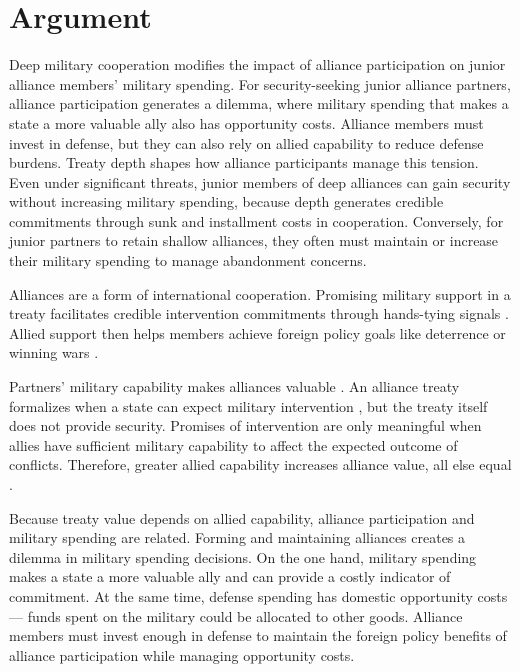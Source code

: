 \documentclass[12pt]{article}
\begin{document}
\section{Argument}

Deep military cooperation modifies the impact of alliance participation on junior alliance members' military spending.
For security-seeking junior alliance partners, alliance participation generates a dilemma, where military spending that makes a state a more valuable ally also has opportunity costs. 
Alliance members must invest in defense, but they can also rely on allied capability to reduce defense burdens. 
Treaty depth shapes how alliance participants manage this tension. 
Even under significant threats, junior members of deep alliances can gain security without increasing military spending, because depth generates credible commitments through sunk and installment costs in cooperation. 
Conversely, for junior partners to retain shallow alliances, they often must maintain or increase their military spending to manage abandonment concerns. 


Alliances are a form of international cooperation. 
Promising military support in a treaty facilitates credible intervention commitments through hands-tying signals \citep{Fearon1997, Morrow2000}. 
Allied support then helps members achieve foreign policy goals like deterrence or winning wars \citep{Walt1990, Snyder1997}. 


Partners' military capability makes alliances valuable \citep{FordhamPoast2014}. 
An alliance treaty formalizes when a state can expect military intervention \citep{Morrow2000}, but the treaty itself does not provide security. 
Promises of intervention are only meaningful when allies have sufficient military capability to affect the expected outcome of conflicts.  
Therefore, greater allied capability increases alliance value, all else equal \citep{Johnsonetal2015}.


Because treaty value depends on allied capability, alliance participation and military spending are related. 
Forming and maintaining alliances creates a dilemma in military spending decisions. 
On the one hand, military spending makes a state a more valuable ally and can provide a costly indicator of commitment. 
At the same time, defense spending has domestic opportunity costs--- funds spent on the military could be allocated to other goods. 
Alliance members must invest enough in defense to maintain the foreign policy benefits of alliance participation while managing opportunity costs. 
\end{document}
